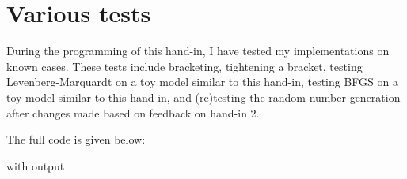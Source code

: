 \section{Various tests}
During the programming of this hand-in, I have tested my implementations on known cases. These tests include bracketing, tightening a bracket, testing Levenberg-Marquardt on a toy model similar to this hand-in, testing BFGS on a toy model similar to this hand-in, and (re)testing the random number generation after changes made based on feedback on hand-in 2.

The full code is given below:

with output
